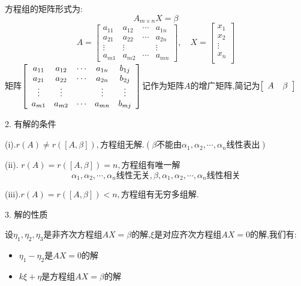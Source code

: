 \begin{definition}[非齐次方程组]
	方程组的矩阵形式为:  
	$$A_{m\times n}X=\beta$$
	$$A=\left[
	\begin{matrix}
		a_{11}&a_{12}&\cdots&a_{1n}\\
		a_{21}&a_{22}&\cdots&a_{2n}\\
		\vdots&\vdots& &\vdots\\
		a_{m1}&a_{m2}&\cdots&a_{mn}
	\end{matrix}
	\right],\quad X=\left[ \begin{matrix}
		x_{1}\\
		x_{2}\\
		\vdots\\
		x_{n}\\
	\end{matrix}\right]$$
	矩阵$\left[ {\begin{array}{c:c}
			\begin{matrix}
				a_{11}&a_{12}&\cdots&a_{1n}\\
				a_{21}&a_{22}&\cdots&a_{2n}\\
				\vdots&\vdots& &\vdots\\
				a_{m1}&a_{m2}&\cdots&a_{mn}
			\end{matrix}&
			\begin{matrix}
				b_{1j}\\
				b_{2j}\\
				\vdots\\
				b_{mj}
			\end{matrix}
	\end{array}} \right]$记作为矩阵$A$的增广矩阵,简记为$\left[ {\begin{array}{c:c}
	\begin{matrix}
		A
	\end{matrix}&
	\begin{matrix}
	\beta
	\end{matrix}
\end{array}} \right]$

	2. 有解的条件
	
	(i).$r(A)\neq r([A,\beta]),\text{方程组无解}.(\beta\text{不能由}\alpha_{1},\alpha_{2},\cdots,\alpha_{n}\text{线性表出})$
	
	(ii). $r(A)=r([A,\beta])=n,\text{方程组有唯一解}$ 
	$$\alpha_{1},\alpha_{2},\cdots,\alpha_{n}\text{线性无关},\beta,\alpha_{1},\alpha_{2},\cdots,\alpha_{n}\text{线性相关}$$
	
	(iii).$r(A)=r([A,\beta])<n,\text{方程组有无穷多组解}.$
	
	3. 解的性质
	
	设$\eta_{1},\eta_{2},\eta_{3}$是非齐次方程组$AX=\beta$的解,$\xi$是对应齐次方程组$AX=0$的解,我们有:  
	\begin{itemize}
		\item $\eta_{1}-\eta_{2}\text{是}AX=0\text{的解}$
		\item $k\xi+\eta\text{是方程组}AX=\beta\text{的解}$
	\end{itemize}
	

\end{definition}
